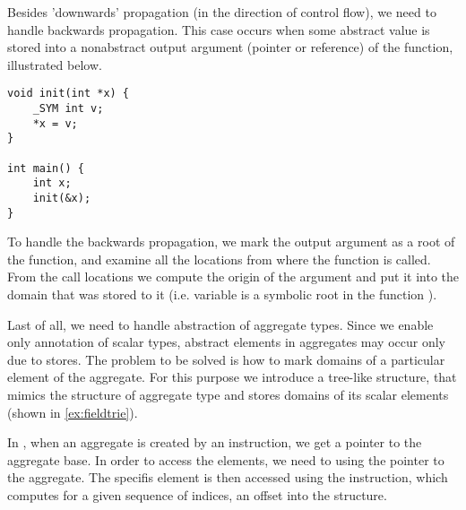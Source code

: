 Besides 'downwards' propagation (in the direction of control flow), we need
to handle backwards propagation. This case occurs when some abstract value is
stored into a nonabstract output argument (pointer or reference) of the function,
illustrated below.
\begin{verbatim}
void init(int *x) {
    _SYM int v;
    *x = v;
}

int main() {
    int x;
    init(&x);
}

\end{verbatim}

To handle the backwards propagation, we mark the output argument as a root of the
function, and examine all the locations from where the function is called. From
the call locations we compute the origin of the argument and put it into the
domain that was stored to it (i.e. variable  is a symbolic root
in the function ).

Last of all, we need to handle abstraction of aggregate types. Since we enable
only annotation of scalar types, abstract elements in aggregates may occur
only due to stores. The problem to be solved is how to mark domains of a
particular element of the aggregate. For this purpose we introduce a tree-like
structure, that mimics the structure of aggregate type and stores domains of
its scalar elements (shown in \autoref{ex:fieldtrie}).

In \LLVM, when an aggregate is created by an  instruction, we get a
pointer to the aggregate base. In order to access the elements, we need to
 using the pointer to the aggregate. The specifis element is then
accessed using the  instruction, which computes for a given
sequence of indices, an offset into the structure.

